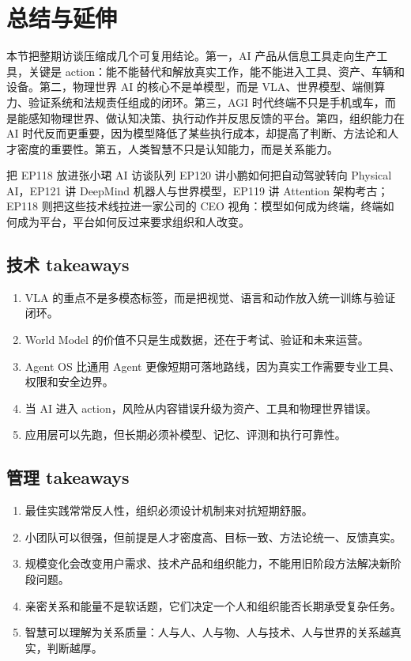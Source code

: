 \section{总结与延伸}

本节把整期访谈压缩成几个可复用结论。第一，AI 产品从信息工具走向生产工具，关键是 action：能不能替代和解放真实工作，能不能进入工具、资产、车辆和设备。第二，物理世界 AI 的核心不是单模型，而是 VLA、世界模型、端侧算力、验证系统和法规责任组成的闭环。第三，AGI 时代终端不只是手机或车，而是能感知物理世界、做认知决策、执行动作并反思反馈的平台。第四，组织能力在 AI 时代反而更重要，因为模型降低了某些执行成本，却提高了判断、方法论和人才密度的重要性。第五，人类智慧不只是认知能力，而是关系能力。

\begin{importantbox}{把 EP118 放进张小珺 AI 访谈队列}
EP120 讲小鹏如何把自动驾驶转向 Physical AI，EP121 讲 DeepMind 机器人与世界模型，EP119 讲 Attention 架构考古；EP118 则把这些技术线拉进一家公司的 CEO 视角：模型如何成为终端，终端如何成为平台，平台如何反过来要求组织和人改变。
\end{importantbox}

\subsection{技术 takeaways}

\begin{enumerate}
\item VLA 的重点不是多模态标签，而是把视觉、语言和动作放入统一训练与验证闭环。
\item World Model 的价值不只是生成数据，还在于考试、验证和未来运营。
\item Agent OS 比通用 Agent 更像短期可落地路线，因为真实工作需要专业工具、权限和安全边界。
\item 当 AI 进入 action，风险从内容错误升级为资产、工具和物理世界错误。
\item 应用层可以先跑，但长期必须补模型、记忆、评测和执行可靠性。
\end{enumerate}

\subsection{管理 takeaways}

\begin{enumerate}
\item 最佳实践常常反人性，组织必须设计机制来对抗短期舒服。
\item 小团队可以很强，但前提是人才密度高、目标一致、方法论统一、反馈真实。
\item 规模变化会改变用户需求、技术产品和组织能力，不能用旧阶段方法解决新阶段问题。
\item 亲密关系和能量不是软话题，它们决定一个人和组织能否长期承受复杂任务。
\item 智慧可以理解为关系质量：人与人、人与物、人与技术、人与世界的关系越真实，判断越厚。
\end{enumerate}

